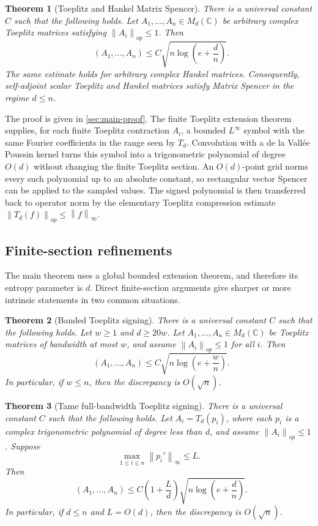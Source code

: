 \documentclass[11pt]{amsart}
\newtheorem{theorem}{Theorem}[section]
\theoremstyle{definition}
\DeclareMathOperator{\discop}{disc_{op}}
\newcommand{\C}{\mathbb C}
\newcommand{\norm}[1]{\left\lVert #1\right\rVert}
\begin{document}
\begin{theorem}[Toeplitz and Hankel Matrix Spencer]\label{thm:main}
There is a universal constant $C$ such that the following holds.  Let
$A_1,\ldots,A_n\in M_d(\C)$ be arbitrary complex Toeplitz matrices satisfying
$\norm{A_i}_{op}\le1$.  Then
\[
   \discop(A_1,\ldots,A_n)
   \le C\sqrt{n\log\!\left(e+\frac dn\right)} .
\]
The same estimate holds for arbitrary complex Hankel matrices.  Consequently,
self-adjoint scalar Toeplitz and Hankel matrices satisfy Matrix Spencer in the
regime $d\le n$.
\end{theorem}

The proof is given in \cref{sec:main-proof}.  The finite Toeplitz extension
theorem supplies, for each finite Toeplitz contraction $A_i$, a bounded
$L^\infty$ symbol with the same Fourier coefficients in the range seen by
$T_d$.  Convolution with a de la Vall\'ee Poussin kernel turns this symbol into a
trigonometric polynomial of degree $O(d)$ without changing the finite Toeplitz
section.  An $O(d)$-point grid norms every such polynomial up to an absolute
constant, so rectangular vector Spencer can be applied to the sampled values.
The signed polynomial is then transferred back to operator norm by the elementary
Toeplitz compression estimate $\norm{T_d(f)}_{op}\le\norm{f}_\infty$.

\subsection{Finite-section refinements}

The main theorem uses a global bounded extension theorem, and therefore its
entropy parameter is $d$.  Direct finite-section arguments give sharper or more
intrinsic statements in two common situations.

\begin{theorem}[Banded Toeplitz signing]\label{thm:banded-intro}
There is a universal constant $C$ such that the following holds.  Let
$w\ge1$ and $d\ge20w$.  Let $A_1,\ldots,A_n\in M_d(\C)$ be Toeplitz matrices of
bandwidth at most $w$, and assume $\norm{A_i}_{op}\le1$ for all $i$.  Then
\[
   \discop(A_1,\ldots,A_n)
   \le C\sqrt{n\log\!\left(e+\frac wn\right)} .
\]
In particular, if $w\le n$, then the discrepancy is $O(\sqrt n)$.
\end{theorem}

\begin{theorem}[Tame full-bandwidth Toeplitz signing]\label{thm:tame-intro}
There is a universal constant $C$ such that the following holds.  Let
$A_i=T_d(p_i)$, where each $p_i$ is a complex trigonometric polynomial of degree
less than $d$, and assume $\norm{A_i}_{op}\le1$.  Suppose
\[
   \max_{1\le i\le n}\norm{p_i'}_\infty\le L .
\]
Then
\[
   \discop(A_1,\ldots,A_n)
   \le C\left(1+\frac Ld\right)
      \sqrt{n\log\!\left(e+\frac dn\right)} .
\]
In particular, if $d\le n$ and $L=O(d)$, then the discrepancy is $O(\sqrt n)$.
\end{theorem}
\end{document}
